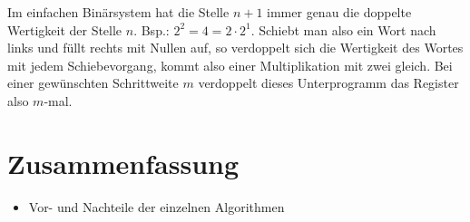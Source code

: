 \documentclass[fleqn, a4paper, 1pt]{article}       %
\begin{document}
Im einfachen Binärsystem hat die Stelle $n+1$ immer genau die doppelte Wertigkeit der Stelle $n$. Bsp.: $2^2 = 4 = 2 \cdot 2^1$. Schiebt man also ein Wort nach links und füllt rechts mit Nullen auf, so verdoppelt sich die Wertigkeit des Wortes mit jedem Schiebevorgang, kommt also einer Multiplikation mit zwei gleich. Bei einer gewünschten Schrittweite $m$ verdoppelt dieses Unterprogramm das Register also $m$-mal.


\section{Zusammenfassung}

\begin{itemize}
    \item Vor- und Nachteile der einzelnen Algorithmen
\end{itemize}




%

\newpage
\appendix %
\end{document}
